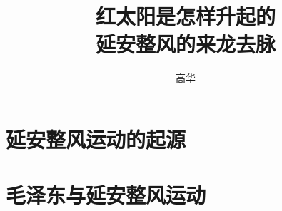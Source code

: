 \documentclass{gh-class}
\begin{document}
\frontmatter
\title{\fzzhysong 红太阳是怎样升起的\\延安整风的来龙去脉
}
\author{\fzzhdxian 高华 }
\date{}
\maketitle


\mainmatter
\part{延安整风运动的起源}







\part{毛泽东与延安整风运动}










\backmatter

\end{document}
